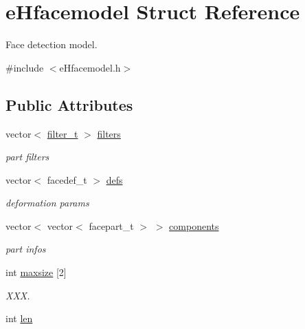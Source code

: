 \hypertarget{structeHfacemodel}{\section{e\-Hfacemodel Struct Reference}
\label{structeHfacemodel}
}


Face detection model.  




{\ttfamily \#include $<$e\-Hfacemodel.\-h$>$}

\subsection*{Public Attributes}
\begin{DoxyCompactItemize}
\item 
vector$<$ \hyperlink{eHfilter_8h_a31d0710a76998e6bea728a5c5ea09538}{filter\-\_\-t} $>$ \hyperlink{structeHfacemodel_a123d519573ca06cd4eba441997206e38}{filters}
\begin{DoxyCompactList}\small\item\em part filters \end{DoxyCompactList}\item 
\hypertarget{structeHfacemodel_ac59c3e3b7902c775b125cc8ca0f21d62}{vector$<$ facedef\-\_\-t $>$ \hyperlink{structeHfacemodel_ac59c3e3b7902c775b125cc8ca0f21d62}{defs}}\label{structeHfacemodel_ac59c3e3b7902c775b125cc8ca0f21d62}

\begin{DoxyCompactList}\small\item\em deformation params \end{DoxyCompactList}\item 
\hypertarget{structeHfacemodel_a0ab9deba4961009ee3a099d33606c07e}{vector$<$ vector$<$ facepart\-\_\-t $>$ $>$ \hyperlink{structeHfacemodel_a0ab9deba4961009ee3a099d33606c07e}{components}}\label{structeHfacemodel_a0ab9deba4961009ee3a099d33606c07e}

\begin{DoxyCompactList}\small\item\em part infos \end{DoxyCompactList}\item 
\hypertarget{structeHfacemodel_ab54ffe458e67505973138e5a80ef2fff}{int \hyperlink{structeHfacemodel_ab54ffe458e67505973138e5a80ef2fff}{maxsize} \mbox{[}2\mbox{]}}\label{structeHfacemodel_ab54ffe458e67505973138e5a80ef2fff}

\begin{DoxyCompactList}\small\item\em X\-X\-X. \end{DoxyCompactList}\item 
\hypertarget{structeHfacemodel_ad0ce04ae00f98e810e4ae316ca7deba9}{int \hyperlink{structeHfacemodel_ad0ce04ae00f98e810e4ae316ca7deba9}{len}}\label{structeHfacemodel_ad0ce04ae00f98e810e4ae316ca7deba9}


\end{DoxyCompactItemize}
